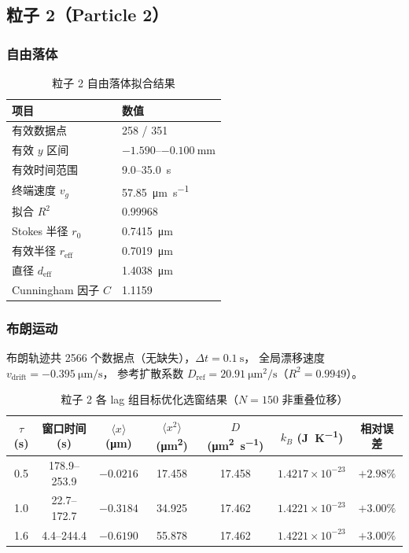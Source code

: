 \documentclass[12pt,a4paper]{ctexart}
\begin{document}
\clearpage
\subsection{粒子 2（Particle 2）}

\subsubsection{自由落体}

\begin{table}[h]
\centering
\caption{粒子 2 自由落体拟合结果}
\label{tab:p2_freefall}
\begin{tabular}{ll}
\toprule
项目 & 数值 \\
\midrule
有效数据点 & 258 / 351 \\
有效 $y$ 区间 & $-1.590$--$\SI{-0.100}{\milli\metre}$ \\
有效时间范围 & 9.0--\SI{35.0}{\second} \\
终端速度 $v_g$ & \SI{57.85}{\micro\metre\per\second} \\
拟合 $R^2$ & 0.99968 \\
Stokes 半径 $r_0$ & \SI{0.7415}{\micro\metre} \\
有效半径 $r_\text{eff}$ & \SI{0.7019}{\micro\metre} \\
直径 $d_\text{eff}$ & \SI{1.4038}{\micro\metre} \\
Cunningham 因子 $C$ & 1.1159 \\
\bottomrule
\end{tabular}
\end{table}

\subsubsection{布朗运动}

布朗轨迹共 2566 个数据点（无缺失），$\Delta t = \SI{0.1}{\second}$，
全局漂移速度 $v_\text{drift} = \SI{-0.395}{\micro\metre\per\second}$，
参考扩散系数 $D_\text{ref} = \SI{20.91}{\micro\metre^2\per\second}$（$R^2 = 0.9949$）。

\begin{table}[h]
\centering
\caption{粒子 2 各 lag 组目标优化选窗结果（$N=150$ 非重叠位移）}
\label{tab:p2_results}
\begin{tabular}{ccccccc}
\toprule
$\tau$ (s) & 窗口时间 (s) & $\langle x\rangle$ (\si{\micro\metre}) & $\langle x^2\rangle$ (\si{\micro\metre^2}) & $D$ (\si{\micro\metre^2\per\second}) & $k_B$ (\si{\joule\per\kelvin}) & 相对误差 \\
\midrule
0.5 & 178.9--253.9 & $-0.0216$ & 17.458 & 17.458 & $1.4217\times10^{-23}$ & $+2.98\%$ \\
1.0 & 22.7--172.7  & $-0.3184$ & 34.925 & 17.462 & $1.4221\times10^{-23}$ & $+3.00\%$ \\
1.6 & 4.4--244.4   & $-0.6190$ & 55.878 & 17.462 & $1.4221\times10^{-23}$ & $+3.00\%$ \\
\bottomrule
\end{tabular}
\end{table}
\end{document}
